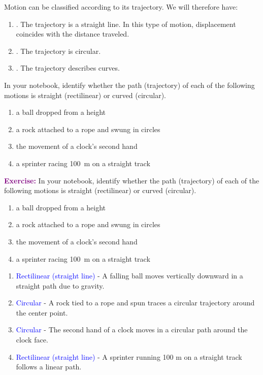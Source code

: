 Motion can be classified according to its trajectory.
We will therefore have:
\begin{enumerate}[label=\letraminuscula]
        \item {}.
        The trajectory is a straight line.
        In this type of motion, displacement coincides with the distance traveled.
        \item {}.
        The trajectory is circular.
        \item {}.
        The trajectory describes curves.
\end{enumerate}

\begin{exercise}
    In your notebook, identify whether the path (trajectory) of each of the following motions is straight (rectilinear) or curved (circular).
    \begin{enumerate}[label=\letraminuscula]
        \item a ball dropped from a height
        \item a rock attached to a rope and swung in circles
        \item the movement of a clock's second hand
        \item a sprinter racing \qty{100}{\metre} on a straight track
    \end{enumerate}
    \begin{solu}
        \textbf{\textcolor{purple}{Exercise:}} In your notebook, identify whether the path (trajectory) of each of the following motions is straight (rectilinear) or curved (circular).
        \begin{enumerate}[label=\letraminuscula]
            \item a ball dropped from a height
            \item a rock attached to a rope and swung in circles
            \item the movement of a clock's second hand
            \item a sprinter racing \qty{100}{\metre} on a straight track
        \end{enumerate}

        \vspace{0.3cm}

        \begin{enumerate}[label=\letraminuscula]
            \item \textcolor{blue}{Rectilinear (straight line)} - A falling ball moves vertically downward in a straight path due to gravity.
            \item \textcolor{blue}{Circular} - A rock tied to a rope and spun traces a circular trajectory around the center point.
            \item \textcolor{blue}{Circular} - The second hand of a clock moves in a circular path around the clock face.
            \item \textcolor{blue}{Rectilinear (straight line)} - A sprinter running 100 m on a straight track follows a linear path.
        \end{enumerate}
    \end{solu}
\end{exercise}

